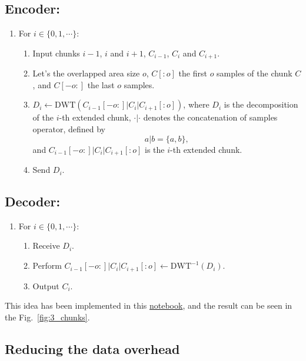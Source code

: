 \subsection*{Encoder:}
\begin{enumerate}
\item For $i\in\{0,1,\cdots\}$:   
  \begin{enumerate}               
  \item Input chunks $i-1$, $i$ and $i+1$, $C_{i-1}$, $C_i$ and $C_{i+1}$.
  \item Let's the overlapped area size $o$, $C[:o]$ the first $o$
    samples of the chunk $C$, and $C[-o:]$ the last $o$ samples.
  \item $D_i \leftarrow \text{DWT}(C_{i-1}[-o:]|C_i|C_{i+1}[:o])$, where $D_i$ is the
    decomposition of the $i$-th extended chunk, $\cdot|\cdot$ denotes
    the concatenation of samples operator, defined by
    \begin{equation}
      a|b = \{a,b\},
    \end{equation}
    and $C_{i-1}[-o:]|C_i|C_{i+1}[:o]$ is the $i$-th extended chunk.
  \item Send $D_i$.
  \end{enumerate}
\end{enumerate}

\subsection*{Decoder:}
\begin{enumerate}
\item For $i\in\{0,1,\cdots\}$:
  \begin{enumerate}
  \item Receive $D_i$.
  \item Perform $C_{i-1}[-o:]|C_i|C_{i+1}[:o]\leftarrow\text{DWT}^{-1}(D_i)$.
  \item Output $C_i$.
  \end{enumerate}
\end{enumerate}

This idea has been implemented in this
\href{https://github.com/Tecnologias-multimedia/intercom/blob/master/docs/overlapped_DWT_I.ipynb}{notebook},
and the result can be seen in the Fig.~\ref{fig:3_chunks}.

\subsection{Reducing the data overhead}

